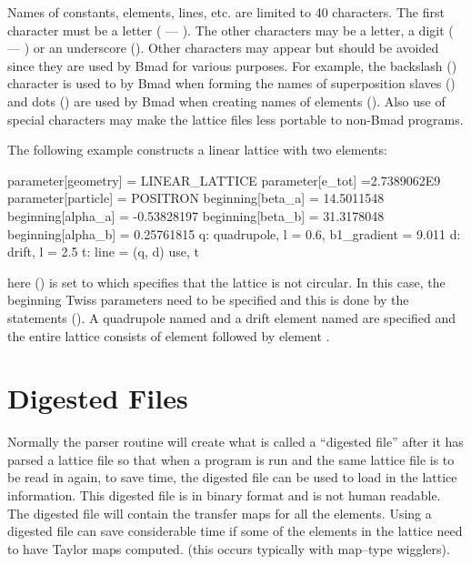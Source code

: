 Names of constants, elements, lines, etc. are limited to 40
characters. The first character must be a letter ( --- ).
The other characters may be a letter, a digit ( --- ) or
an underscore (\vn{_}). Other characters may appear but should be avoided
since they are used by Bmad for various purposes. For example, the 
backslash (\vn{\B}) character is used to by Bmad when forming the names of
superposition slaves () and dots () are used by Bmad 
when creating names of  elements (). Also use of
special characters may make the lattice files less portable to non-Bmad programs.

The following example constructs a linear lattice with two elements: 
\begin{example}
  parameter[geometry] = LINEAR_LATTICE
  parameter[e_tot] =2.7389062E9
  parameter[particle] = POSITRON
  beginning[beta_a] = 14.5011548
  beginning[alpha_a] = -0.53828197
  beginning[beta_b] = 31.3178048
  beginning[alpha_b] = 0.25761815
  q: quadrupole, l = 0.6, b1_gradient = 9.011
  d: drift, l = 2.5
  t: line = (q, d)
  use, t 
\end{example}
here  () is set to 
which specifies that the lattice is not circular. In this case, the beginning 
Twiss parameters need to be specified and this is done by the 
statements (). A quadrupole named 
and a drift element named  are specified
and the entire lattice consists of element  followed by element .

\section{Digested Files}
\label{s:digested}

Normally the \bmad parser routine will create what is called a
``digested file'' after it has parsed a lattice file so that when a
program is run and the same lattice file is to be read in again, to save
time, the digested file can be used to load in the lattice information.
This digested file is in binary format and is not human readable. The
digested file will contain the transfer maps for all the elements. 
Using a digested file can save considerable time if some of the
elements in the lattice need to have Taylor maps computed.
(this occurs typically with map--type wigglers).

